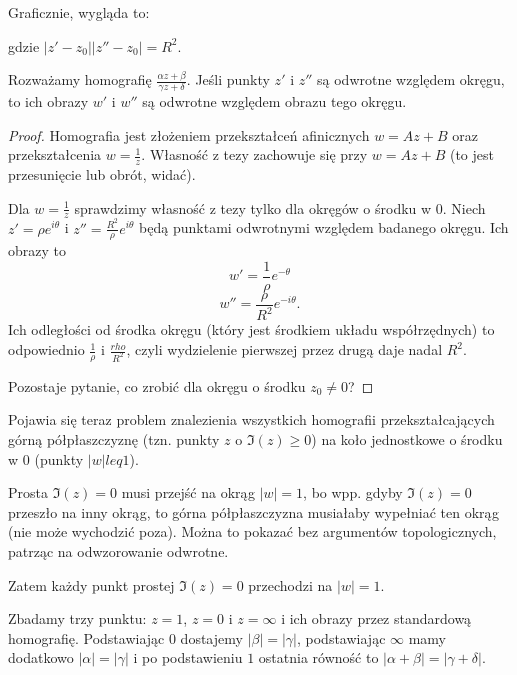 Graficznie, wygląda to:
  \begin{center}\end{center}
gdzie $|z'-z_0||z''-z_0|=R^2$.

\begin{theorem}
  Rozważamy homografię $\frac{\alpha z+\beta}{\gamma z+\delta}$. Jeśli punkty $z'$ i $z''$ są odwrotne względem okręgu, to ich obrazy $w'$ i $w''$ są odwrotne względem obrazu tego okręgu.
\end{theorem}

\begin{proof}
  Homografia jest złożeniem przekształceń afinicznych $w=Az+B$ oraz przekształcenia $w=\frac{1}{z}$. Własność z tezy zachowuje się przy $w=Az+B$ (to jest przesunięcie lub obrót, widać).

  Dla $w=\frac{1}{z}$ sprawdzimy własność z tezy tylko dla okręgów o środku w $0$. Niech $z'=\rho e^{i\theta}$ i $z''=\frac{R^2}{\rho}e^{i\theta}$ będą punktami odwrotnymi względem badanego okręgu. Ich obrazy to
  $$w'=\frac{1}{\rho}e^{-\theta}$$
  $$w''=\frac{\rho}{R^2}e^{-i\theta}.$$
  Ich odległości od środka okręgu (który jest środkiem układu współrzędnych) to odpowiednio $\frac{1}{\rho}$ i $\frac{rho}{R^2}$, czyli wydzielenie pierwszej przez drugą daje nadal $R^2$.

  Pozostaje pytanie, co zrobić dla okręgu o środku $z_0\neq 0$?
\end{proof}

Pojawia się teraz problem znalezienia wszystkich homografii przekształcających górną półpłaszczyznę (tzn. punkty $z$ o $\Im(z)\geq 0$) na koło jednostkowe o środku w $0$ (punkty $|w|leq 1$).

Prosta $\Im(z)=0$ musi przejść na okrąg $|w|=1$, bo wpp. gdyby $\Im(z)=0$ przeszło na inny okrąg, to górna półpłaszczyzna musiałaby wypełniać ten okrąg (nie może wychodzić poza). Można to pokazać bez argumentów topologicznych, patrząc na odwzorowanie odwrotne.

Zatem każdy punkt prostej $\Im(z)=0$ przechodzi na $|w|=1$.

Zbadamy trzy punktu: $z=1$, $z=0$ i $z=\infty$ i ich obrazy przez standardową homografię. Podstawiając $0$ dostajemy $|\beta|=|\gamma|$, podstawiając $\infty$ mamy dodatkowo $|\alpha|=|\gamma|$ i po podstawieniu $1$ ostatnia równość to  $|\alpha+\beta|=|\gamma+\delta|$.

